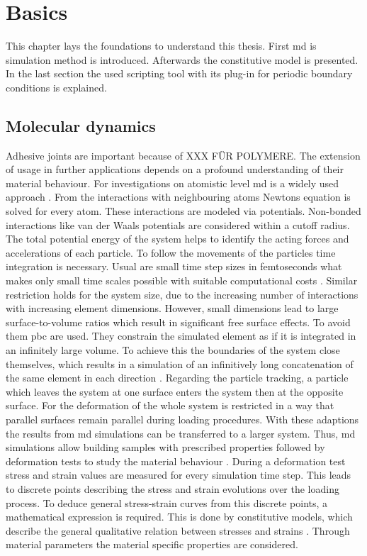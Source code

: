 \chapter{Basics} \label{chap: basics}
This chapter lays the foundations to understand this thesis. First \acrfull{md} is simulation method is introduced. Afterwards the constitutive model is presented. In the last section the used scripting tool with its plug-in for periodic boundary conditions is explained.  

\section{Molecular dynamics} \label{sec: MDBasics}
Adhesive joints are important because of XXX FÜR POLYMERE. The extension of usage in further applications depends on a profound understanding of their material behaviour. For investigations on atomistic level \acrfull{md} is a widely used approach  \cite{ries_mechanical_2024}. From the interactions with neighbouring atoms Newtons equation is solved for every atom. These interactions are modeled via potentials. Non-bonded interactions like van der Waals potentials are considered within a cutoff radius. The total potential energy of the system helps to identify the acting forces and accelerations of each particle. To follow the movements of the particles time integration is necessary. Usual are small time step sizes in femtoseconds what makes only small time scales possible with suitable computational costs \cite{ries_mechanical_2024}. Similar restriction holds for the system size, due to the increasing number of interactions with increasing element dimensions. However, small dimensions lead to large surface-to-volume ratios which result in significant free surface effects. To avoid them \acrfull{pbc} are used. They constrain the simulated element as if it is integrated in an infinitely large volume. To achieve this the boundaries of the system close themselves, which results in a simulation of an infinitively long concatenation of the same element in each direction \cite{gorbunov_periodic_2022}. Regarding the particle tracking, a particle which leaves the system at one surface enters the system then at the opposite surface. For the deformation of the whole system is restricted in a way that parallel surfaces remain parallel during loading procedures. With these adaptions the results from \acrshort{md} simulations can be transferred to a larger system. Thus, \acrshort{md} simulations allow building samples with prescribed properties followed by deformation tests to study the material behaviour \cite{buyukozturk_structural_2011}. During a deformation test stress and strain values are measured for every simulation time step. This leads to discrete points describing the stress and strain evolutions over the loading process. To deduce general stress-strain curves from this discrete points, a mathematical expression is required. This is done by constitutive models, which describe the general qualitative relation between stresses and strains \cite{mergheim_lecture_nodate}. Through material parameters the material specific properties are considered.
